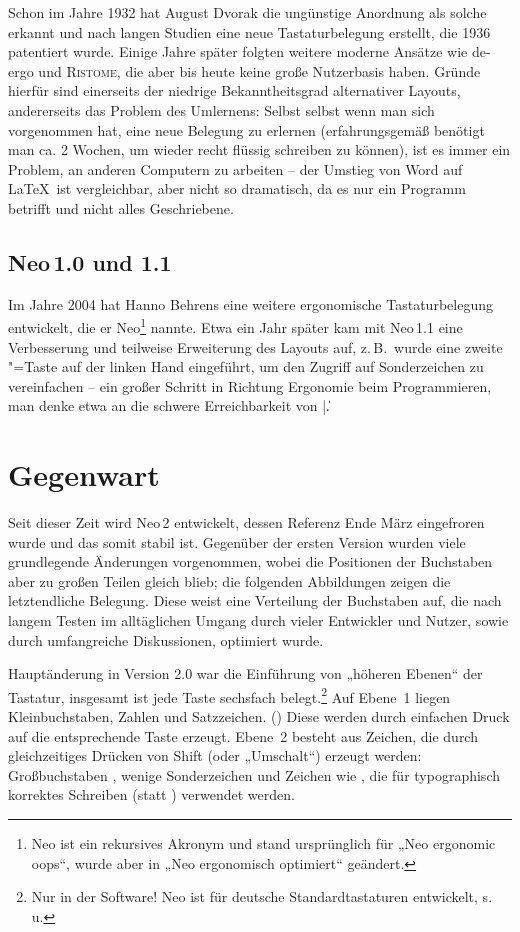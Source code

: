 \documentclass[ngerman]{dtk}
\newcommand{\taste}[1]{\makebox{\textsf{#1}}}
\newcommand\neoio{Neo\,1.0\xspace}
\newcommand\neoioi{Neo\,1.1\xspace}
\newcommand\neoii{Neo\,2\xspace}
\begin{document}
Schon im Jahre 1932 hat August Dvorak die ungünstige Anordnung als solche erkannt und nach langen Studien eine neue Tastaturbelegung erstellt, die 1936 patentiert wurde.\cite{patentdvorak} Einige Jahre später folgten weitere moderne Ansätze wie de-ergo und \textsc{Ristome}, die aber bis heute keine große Nutzerbasis haben. \cite{deergo,ristome} Gründe hierfür sind einerseits der niedrige Bekanntheitsgrad alternativer Layouts, andererseits das Problem des Umlernens: Selbst selbst wenn man sich vorgenommen hat, eine neue Belegung zu erlernen (erfahrungsgemäß benötigt man ca. 2 Wochen, um wieder recht flüssig schreiben zu können), ist es immer ein Problem, an anderen Computern zu arbeiten – der Umstieg von Word auf \LaTeX\ ist vergleichbar, aber nicht so dramatisch, da es nur ein Programm betrifft und nicht alles Geschriebene.

\subsection{\neoio und 1.1}
Im Jahre 2004 hat Hanno Behrens eine weitere ergonomische Tastaturbelegung entwickelt, die er Neo\footnote{Neo ist ein rekursives Akronym und stand ursprünglich für „Neo ergonomic oops“, wurde aber in „Neo ergonomisch optimiert“ geändert.} nannte. Etwa ein Jahr später kam mit \neoioi eine Verbesserung und teilweise Erweiterung des Layouts auf, z.\,B.\ wurde eine zweite \taste{Alt Gr}"=Taste auf der linken Hand eingeführt, um den Zugriff auf Sonderzeichen zu vereinfachen – ein großer Schritt in Richtung Ergonomie beim Programmieren, man denke etwa an die schwere Erreichbarkeit von |{}\|.

\section{Gegenwart}
Seit dieser Zeit wird \neoii entwickelt, dessen Referenz Ende März eingefroren wurde und das somit stabil ist.\cite{neo2} Gegenüber der ersten Version wurden viele grundlegende Änderungen vorgenommen, wobei die Positionen der Buchstaben aber zu großen Teilen gleich blieb; die folgenden Abbildungen zeigen die letztendliche Belegung. Diese weist eine Verteilung der Buchstaben auf, die nach langem Testen im alltäglichen Umgang durch vieler Entwickler und Nutzer, sowie durch umfangreiche Diskussionen, optimiert wurde.

Hauptänderung in Version 2.0 war die Einführung von „höheren Ebenen“ der Tastatur, insgesamt ist jede Taste sechsfach belegt.\footnote{Nur in der Software! Neo ist für deutsche Standardtastaturen entwickelt, s.\,u.} Auf Ebene~1 liegen Kleinbuchstaben, Zahlen und Satzzeichen. (\taste{abc.,}) Diese werden durch einfachen Druck auf die entsprechende Taste erzeugt. Ebene~2 besteht aus Zeichen, die durch gleichzeitiges Drücken von Shift (oder „Umschalt“) erzeugt werden: Großbuchstaben \taste{A}, wenige Sonderzeichen \taste{§} und Zeichen wie \taste{»« „“}, die für typographisch korrektes Schreiben (statt \taste{"}) verwendet werden.
\end{document}
